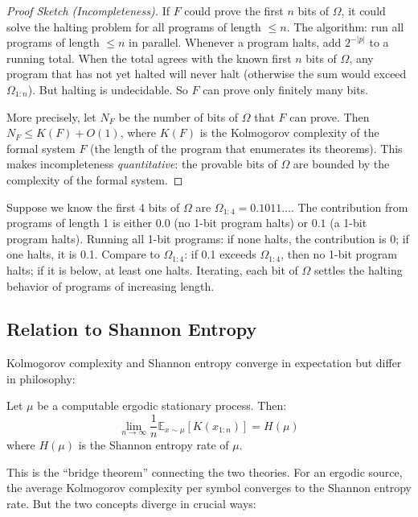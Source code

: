 \begin{proof}[Proof Sketch (Incompleteness)]
If $F$ could prove the first $n$ bits of $\Omega$, it could solve the halting problem for all programs of length $\le n$. The algorithm: run all programs of length $\le n$ in parallel. Whenever a program halts, add $2^{-|p|}$ to a running total. When the total agrees with the known first $n$ bits of $\Omega$, any program that has not yet halted will never halt (otherwise the sum would exceed $\Omega_{1:n}$). But halting is undecidable. So $F$ can prove only finitely many bits.

More precisely, let $N_F$ be the number of bits of $\Omega$ that $F$ can prove. Then $N_F \le K(F) + O(1)$, where $K(F)$ is the Kolmogorov complexity of the formal system $F$ (the length of the program that enumerates its theorems). This makes incompleteness \emph{quantitative}: the provable bits of $\Omega$ are bounded by the complexity of the formal system.
\end{proof}

\begin{example}
Suppose we know the first 4 bits of $\Omega$ are $\Omega_{1:4} = 0.1011\ldots$. The contribution from programs of length 1 is either $0.0$ (no 1-bit program halts) or $0.1$ (a 1-bit program halts). Running all 1-bit programs: if none halts, the contribution is 0; if one halts, it is 0.1. Compare to $\Omega_{1:4}$: if 0.1 exceeds $\Omega_{1:4}$, then no 1-bit program halts; if it is below, at least one halts. Iterating, each bit of $\Omega$ settles the halting behavior of programs of increasing length.
\end{example}

\subsection{Relation to Shannon Entropy}
\label{sec:kolmogorov:shannon}

Kolmogorov complexity and Shannon entropy converge in expectation but differ in philosophy:

\begin{theorem}
Let $\mu$ be a computable ergodic stationary process. Then:
\[
\lim_{n\to\infty} \frac{1}{n} \mathbb{E}_{x \sim \mu}[K(x_{1:n})] = H(\mu)
\]
where $H(\mu)$ is the Shannon entropy rate of $\mu$.
\end{theorem}

This is the ``bridge theorem'' connecting the two theories. For an ergodic source, the average Kolmogorov complexity per symbol converges to the Shannon entropy rate. But the two concepts diverge in crucial ways:


